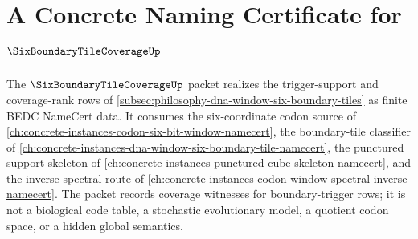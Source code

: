 \chapter{A Concrete Naming Certificate for $\SixBoundaryTileCoverageUp$}
\label{ch:concrete-instances-six-boundary-tile-coverage-namecert}

The $\SixBoundaryTileCoverageUp$ packet realizes the trigger-support and coverage-rank rows of \autoref{subsec:philosophy-dna-window-six-boundary-tiles} as finite BEDC NameCert data. It consumes the six-coordinate codon source of \autoref{ch:concrete-instances-codon-six-bit-window-namecert}, the boundary-tile classifier of \autoref{ch:concrete-instances-dna-window-six-boundary-tile-namecert}, the punctured support skeleton of \autoref{ch:concrete-instances-punctured-cube-skeleton-namecert}, and the inverse spectral route of \autoref{ch:concrete-instances-codon-window-spectral-inverse-namecert}. The packet records coverage witnesses for boundary-trigger rows; it is not a biological code table, a stochastic evolutionary model, a quotient codon space, or a hidden global semantics.


